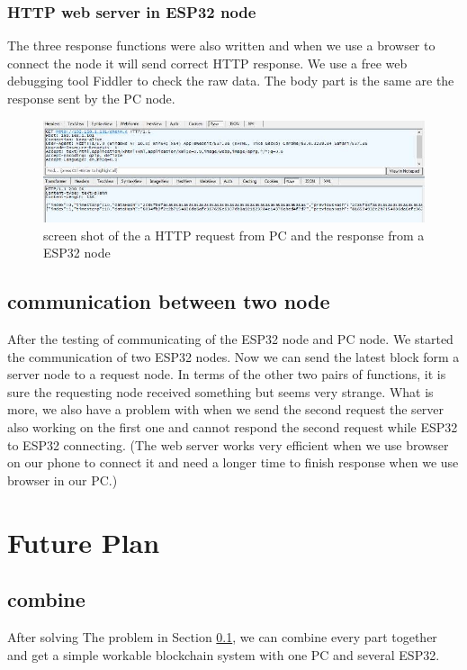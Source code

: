 \documentclass{article}
\begin{document}
    \subsubsection{HTTP web server in ESP32 node}
    The three response functions were also written and when we use a browser to connect the node it will send correct HTTP response. We use a free web debugging tool Fiddler to check the raw data. The body part is the same are the response sent by the PC node.
    \begin{figure}[h]
      \centering
      \includegraphics[scale=0.4]{package.jpg}
      \caption{screen shot of the a HTTP request from PC and the response from a ESP32 node}
      \label{fig:partition table}
    \end{figure}

    \subsection{communication between two node} \label{sec:communication}
    After the testing of communicating of the ESP32 node and PC node. We started the communication of two ESP32 nodes. Now we can send the latest block form a server node to a request node. In terms of the other two pairs of functions, it is sure the requesting node received something but seems very strange.
    What is more, we also have a problem with when we send the second request the server also working on the first one and cannot respond the second request while ESP32 to ESP32 connecting. (The web server works very efficient when we use browser on our phone to connect it and need a longer time to finish response when we use browser in our PC.)


\section{Future Plan}
    \subsection{combine}
    After solving The problem in Section \ref{sec:communication}, we can combine every part together and get a simple workable blockchain system with one PC and several ESP32.
\end{document}
